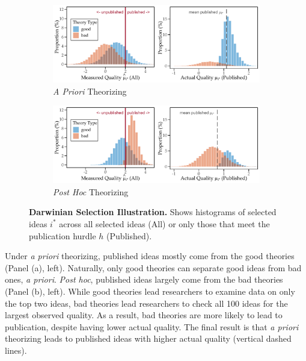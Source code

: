 \documentclass[12pt,english]{article}
\theoremstyle{plain}
\theoremstyle{plain}
\begin{document}
\begin{figure}[t]
    \def\tempwidth{1.0\textwidth}

    \centering
    \begin{subfigure}[b]{\textwidth}
        \centering
        \caption{\emph{A Priori} Theorizing}
        \includegraphics[width=\tempwidth]{exhibits/many-par0-ap.pdf}
    \end{subfigure}
    
    \vspace{1em}
    
    \begin{subfigure}[b]{\textwidth}
        \centering
        \caption{\emph{Post Hoc} Theorizing}
        \includegraphics[width=\tempwidth]{exhibits/many-par0-ph.pdf}
    \end{subfigure}
    \caption{\textbf{Darwinian Selection Illustration.} Shows histograms of selected ideas $i^{\ast}$ across all selected ideas (All) or only those that meet the publication hurdle $h$ (Published).}
    \label{fig:darwinian_selection}
\end{figure}

Under \emph{a priori} theorizing, published ideas mostly come from the good theories (Panel (a), left). Naturally, only good theories can separate good ideas from bad ones, \emph{a priori}. \emph{Post hoc}, published ideas largely come from the bad theories (Panel (b), left). While good theories lead researchers to examine data on only the top two ideas, bad theories lead researchers to check all 100 ideas for the largest observed quality. As a result, bad theories are more likely to lead to publication, despite having lower actual quality. The final result is that \emph{a priori} theorizing leads to published ideas with higher actual quality (vertical dashed lines).
\end{document}
